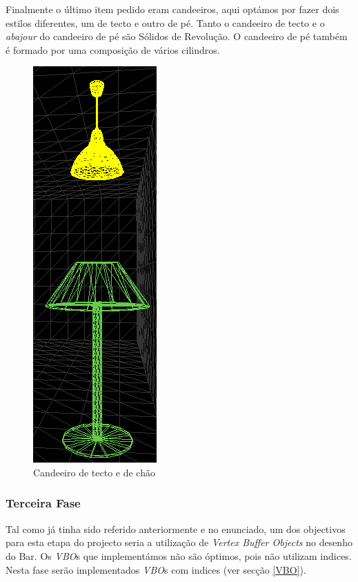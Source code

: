 \documentclass[a5paper,onecolumn, 11pt]{article}
\begin{document}
\begin{description}
Finalmente o último item pedido eram candeeiros, aqui optámos por fazer dois estilos diferentes, um de tecto e outro de pé. Tanto o candeeiro de tecto e o \textit{abajour} do candeeiro de pé são Sólidos de Revolução. O candeeiro de pé também é formado por uma composição de vários cilindros.
\begin{figure}[!htb]
	\centering
	\includegraphics[scale=0.6]{candeeiros.png}
	\caption{Candeeiro de tecto e de chão}
\end{figure}
\end{description}
\clearpage
\subsubsection{Terceira Fase}
Tal como já tinha sido referido anteriormente e no enunciado, um dos objectivos para esta etapa do projecto seria a utilização de \textit{Vertex Buffer Objects} no desenho do Bar. Os \textit{VBO}s que implementámos não são óptimos, pois não utilizam indices. Nesta fase serão implementados \textit{VBO}s com indices (ver secção \ref{VBO}).
\end{document}
